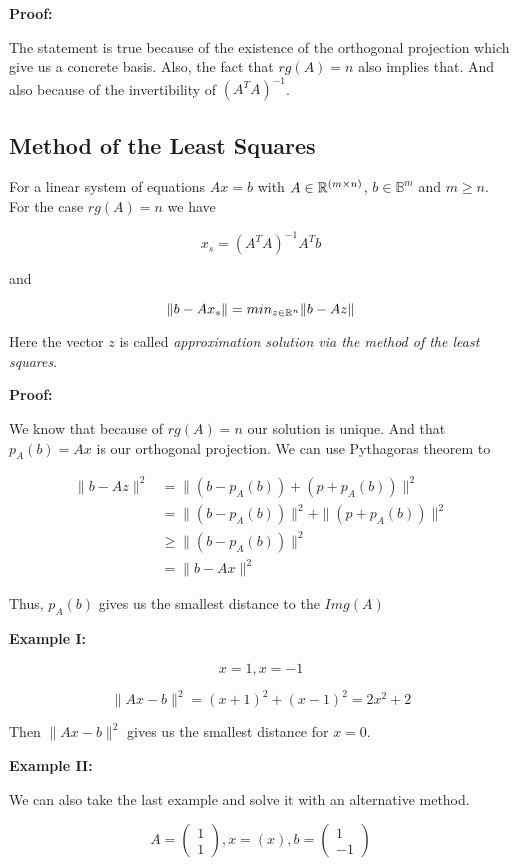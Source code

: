 \textbf{Proof:}

The statement is true because of the existence of the orthogonal projection which give us a concrete basis. Also, 
the fact that \(rg(A) = n\) also implies that. And also because of the invertibility of \({(A^T A)}^{-1}\).

\QED

\subsection{Method of the Least Squares}

For a linear system of equations \(Ax=b\) with \(A \in \mathbb{R}^{(m \times n)}\), 
\(b \in \mathbb{B}^m\) and \(m \ge n\). For the case \(rg(A) = n\) we have

\[
	x_s = {(A^T A)}^{-1} A^T b
\]

and 

\[
	\| b - Ax_s \| = min_{z \in \mathbb{R}^n} \| b - Az \| 
\]

Here the vector \(z\) is called \emph{approximation solution via the method of the least squares}.

\textbf{Proof:}

We know that because of \(rg(A) = n\) our solution is unique. And that \(p_A(b) = Ax\) is our orthogonal 
projection. We can use Pythagoras theorem to

\begin{align*}
	\| b - Az \|^2 &= \| (b  - p_A (b))  + (p + p_A(b)) \|^2 \\
				&=  \| (b  - p_A (b))\|^2  +\|(p + p_A(b)) \|^2 \\
				&\ge  \| (b  - p_A (b))\|^2 \\
				&= \| b - Ax \|^2 
\end{align*}

Thus, \(p_A(b)\) gives us the smallest distance to the \(Img(A)\)

\QED

\textbf{Example I:}

\[
	x = 1, x = -1
\]

\[
	\| Ax - b \|^2 = (x + 1)^2 + (x - 1)^2 = 2x^2 + 2 
\]

Then \(\| Ax - b \|^2\) gives us the smallest distance for \(x = 0\).

\textbf{Example II:}

We can also take the last example and solve it with an alternative method.

\[
	A = \begin{pmatrix} 1 \\ 1 \end{pmatrix}, x = (x), b = \begin{pmatrix} 1 \\ -1 \end{pmatrix}
\]

